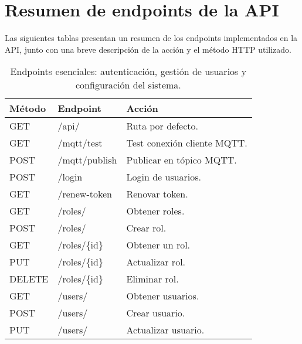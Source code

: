 \chapter{Resumen de endpoints de la API}

\label{AppendixB}

Las siguientes tablas presentan un resumen de los endpoints implementados en la
API, junto con una breve descripción de la acción y el método HTTP utilizado.

\begin{table}[H]
    \centering
    \caption[Endpoints básicos]{Endpoints esenciales: autenticación, gestión de usuarios y configuración del sistema.}  
    \begin{tabular}{l l l}
        \toprule
        \textbf{Método} & \textbf{Endpoint}      & \textbf{Acción}             \\
        \midrule
        GET             & /api/                  & Ruta por defecto.           \\
        GET             & /mqtt/test             & Test conexión cliente MQTT. \\
        POST            & /mqtt/publish          & Publicar en tópico MQTT.    \\
        \midrule
        POST            & /login                 & Login de usuarios.          \\
        GET             & /renew-token           & Renovar token.              \\
        \midrule
        GET             & /roles/                & Obtener roles.              \\
        POST            & /roles/                & Crear rol.                  \\
        GET             & /roles/\{id\}          & Obtener un rol.             \\
        PUT             & /roles/\{id\}          & Actualizar rol.             \\
        DELETE          & /roles/\{id\}          & Eliminar rol.               \\
        \midrule
        GET             & /users/                & Obtener usuarios.           \\
        POST            & /users/                & Crear usuario.              \\
        PUT             & /users/                & Actualizar usuario.         \\

\end{tabular}
\end{table}
